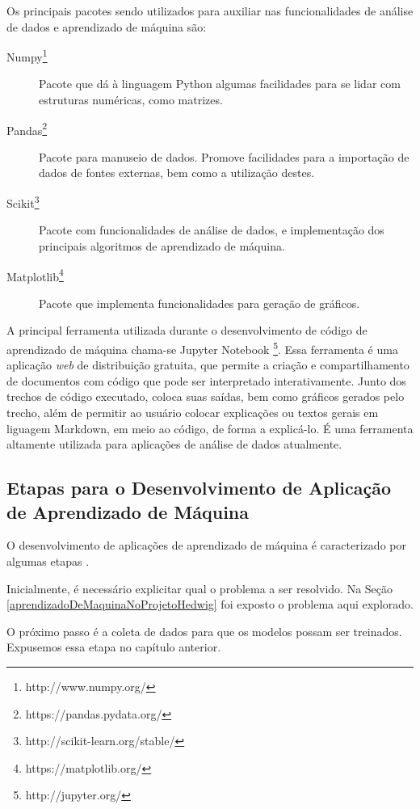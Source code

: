 			Os principais pacotes sendo utilizados para auxiliar nas funcionalidades de análise de dados e aprendizado de máquina são:

			\begin{description}
				\item [Numpy\footnote{http://www.numpy.org/}] Pacote que dá à linguagem Python algumas facilidades para se lidar com estruturas numéricas, como matrizes.
				\item [Pandas\footnote{https://pandas.pydata.org/}] Pacote para manuseio de dados. Promove facilidades para a importação de dados de fontes externas, bem como a utilização destes.
				\item [Scikit\footnote{http://scikit-learn.org/stable/}] Pacote com funcionalidades de análise de dados, e implementação dos principais algoritmos de aprendizado de máquina.
				\item [Matplotlib\footnote{https://matplotlib.org/}] Pacote que implementa funcionalidades para geração de gráficos.
			\end{description}

			A principal ferramenta utilizada durante o desenvolvimento de código de aprendizado de máquina chama-se Jupyter Notebook \footnote{http://jupyter.org/}. Essa ferramenta é uma aplicação \emph{web} de distribuição gratuita, que permite a criação e compartilhamento de documentos com código que pode ser interpretado interativamente. Junto dos trechos de código executado, coloca suas saídas, bem como gráficos gerados pelo trecho, além de permitir ao usuário colocar explicações ou textos gerais em liguagem Markdown, em meio ao código, de forma a explicá-lo. É uma ferramenta altamente utilizada para aplicações de análise de dados atualmente.

		\subsection{Etapas para o Desenvolvimento de Aplicação de Aprendizado de Máquina}

			O desenvolvimento de aplicações de aprendizado de máquina é caracterizado por algumas etapas \cite{whatIsML}.

			Inicialmente, é necessário explicitar qual o problema a ser resolvido. Na Seção \ref{aprendizadoDeMaquinaNoProjetoHedwig} foi exposto o problema aqui explorado.

			O próximo passo é a coleta de dados para que os modelos possam ser treinados. Expusemos essa etapa no capítulo anterior.

